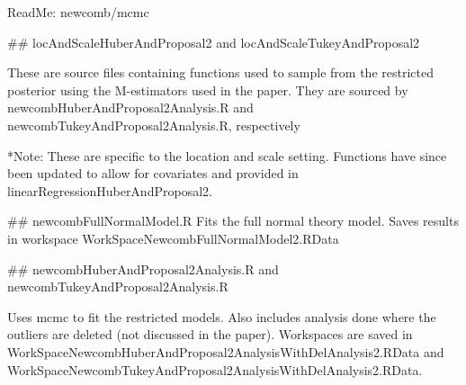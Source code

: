 ReadMe: newcomb/mcmc


##
locAndScaleHuberAndProposal2 and locAndScaleTukeyAndProposal2

These are source files containing functions used to sample from the restricted posterior using the M-estimators used in the paper. They are sourced by newcombHuberAndProposal2Analysis.R and  newcombTukeyAndProposal2Analysis.R, respectively

*Note: These are specific to the location and scale setting. Functions have since been updated to allow for covariates and provided in linearRegressionHuberAndProposal2.

##
newcombFullNormalModel.R
Fits the full normal theory model. Saves results in workspace WorkSpaceNewcombFullNormalModel2.RData

##
newcombHuberAndProposal2Analysis.R and  newcombTukeyAndProposal2Analysis.R

Uses mcmc to fit the restricted models. Also includes analysis done where the outliers are deleted (not discussed in the paper). Workspaces are saved in WorkSpaceNewcombHuberAndProposal2AnalysisWithDelAnalysis2.RData and WorkSpaceNewcombTukeyAndProposal2AnalysisWithDelAnalysis2.RData.